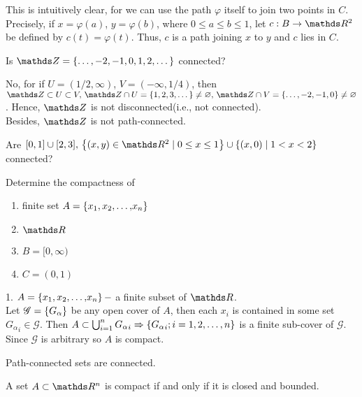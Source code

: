 \documentclass[../main-sheet.tex]{subfiles}
\begin{document}
\begin{soln}
    This is intuitively clear, for we can use the path $ \varphi $ itself to join two points in $ C $. Precisely, if $ x=\varphi(a) $, $ y=\varphi(b) $, where $ 0\leq a\leq b\leq 1 $, let $ c:B\to \R^2 $ be defined by $ c(t)=\varphi(t) $. Thus, $ c $ is a path joining $ x $ to $ y $ and $ c $ lies in $ C $.
\end{soln}
\begin{prob}
    Is $ \Z=\set{\dots, -2, -1, 0 ,1,2,\dots} $ connected?
\end{prob}
\begin{soln}
    No, for if $ U=(1/2, \infty) $, $ V= (-\infty,1/4) $, then $ \Z\subset U\subset V,\, \Z\cap U=\set{1,2,3,\dots}\neq \varnothing    ,\, \Z\cap V=\set{\dots,-2,-1,0}\neq \varnothing $. Hence, $ \Z $ is not disconnected(i.e., not connected).\\
    

    Besides, $ \Z $ is not path-connected.
\end{soln}
\begin{prob}
    Are $ [0,1]\cup [2,3],\, \set{(x,y)\in\R^2\mid 0\leq x\leq1}\cup \set{(x,0)\mid 1<x<2} $ connected?
\end{prob}
\begin{prob}
    Determine the compactness of
    \begin{enumerate}[label=(\roman*)]
        \item finite set $ A=\left\{{x}_1{,}\,{x}_2{,}\dots{,}{x}_n\right\} $
        \item $ \R $
        \item $ B=[0,\infty) $
        \item $ C=(0,1) $
    \end{enumerate}
\end{prob}
\begin{soln}
    1. $ A=\left\{{x}_1{,}\,{x}_2{,}\dots{,}{x}_n\right\} -$ a finite subset of $ \R $.\\
    Let $ \mathscr{G}=\left\{G_\alpha\right\}  $ be any open cover of $ A $, then each $ x_i $ is contained in some set $ {G_\alpha}_i \in \mathscr{G}$. Then $ A\subset \bigcup_{i=1}^n {G_\alpha}_i \Rightarrow \left\{{G_\alpha}_i ; i=1,2,\dots,n\right\}$ is a finite sub-cover of $ \mathscr{G} $. Since $ \mathscr{G} $ is arbitrary so $ A $ is compact.
\end{soln}
\begin{thm}
    Path-connected sets are connected.
\end{thm}
\begin{thm}
    A set $ A\subset \R^n $ is compact if and only if it is closed and bounded.
\end{thm}
\end{document}
